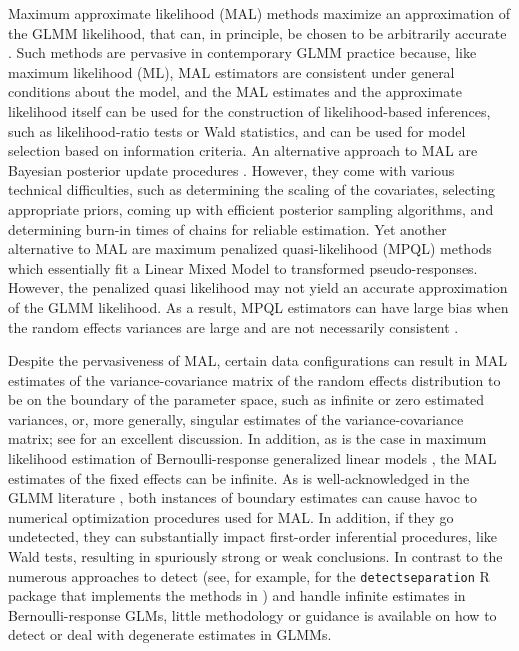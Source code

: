 \documentclass[11pt, a4paper]{article}
\theoremstyle{example} \newtheorem{example}{Example}[section]
\theoremstyle{theorem} \newtheorem{theorem}{Theorem}[section]
\begin{document}
Maximum approximate likelihood (MAL) methods maximize an 
approximation of the GLMM likelihood, that can, in principle, be
chosen to be arbitrarily accurate \citep[see, for example,
][]{raudenbush+etal:2000, pinheiro+chao:2006}. Such methods are
pervasive in contemporary GLMM practice because, like maximum
likelihood (ML), MAL estimators are consistent under general conditions
about the model, and the MAL estimates and the approximate likelihood
itself can be used for the construction of likelihood-based
inferences, such as likelihood-ratio tests or Wald
statistics, and can be used for model selection based on information criteria. An
alternative approach to MAL are Bayesian posterior update procedures
\citep[see, for example,][]{zhao+etal:2006,browne+draper:2006}. However, they come with
various technical difficulties, such as determining the scaling of the
covariates, selecting appropriate priors, coming up with efficient
posterior sampling algorithms, and determining burn-in times of chains
for reliable estimation. Yet another alternative to MAL are maximum
penalized quasi-likelihood (MPQL) methods \citep{schall:1991,
  wolfinger+oconnel:1993, breslow+clayton:1993} which essentially fit a Linear Mixed Model to transformed pseudo-responses. However, the penalized quasi likelihood may not
yield an accurate approximation of the GLMM likelihood. As a result,
MPQL estimators can have large bias when the random effects
variances are large
\citep{bolker+etal:2009,rodriguez+goldman1995} and are
not necessarily consistent \citep[Chapter 3.1]{jiang:2017}.

Despite the pervasiveness of MAL, certain data configurations can
result in MAL estimates of the variance-covariance matrix of the
random effects distribution to be on the boundary of the parameter
space, such as infinite or zero estimated variances, or, more
generally, singular estimates of the variance-covariance matrix; see
\cite{chung+etal:2013} for an excellent discussion. In
addition, as is the case in maximum likelihood estimation of
Bernoulli-response generalized linear models \citep[GLMs; see, for
example][Chapter 4]{mccullagh+nelder:1989}, the MAL estimates of the
fixed effects can be
infinite. As is well-acknowledged in the GLMM literature \citep[see,
for example][]{bolker+etal:2009, bolker:2018,
  pasch+etal:2013}, both instances of boundary estimates can
cause havoc to numerical optimization procedures used for MAL. In
addition, if they go undetected, they can substantially impact
first-order inferential procedures, like Wald tests, resulting in
spuriously strong or weak conclusions. In contrast to the
numerous approaches to detect (see, for example,
\citealt{kosmidis+schumacher:2021} for the \texttt{detectseparation} R
package that implements the methods in \citealt{konis:2017}) and
handle \citep[see, for example,][]{kosmidis+firth:2020,
 heinze+schemper:2002, gelman+etal:2008} infinite
estimates in Bernoulli-response GLMs, little methodology or guidance
is available on how to detect or deal with degenerate estimates in
GLMMs.
\end{document}
